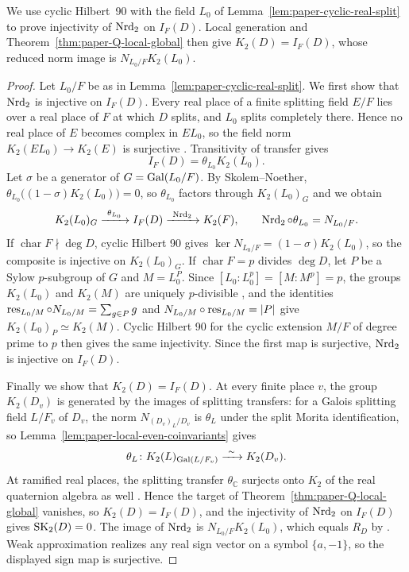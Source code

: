 We use cyclic Hilbert~90 with the field $L_0$ of Lemma~\ref{lem:paper-cyclic-real-split} to prove injectivity of $\operatorname{Nrd}_2$ on $I_F(D)$.
Local generation and Theorem~\ref{thm:paper-Q-local-global} then give $K_2(D)=I_F(D)$, whose reduced norm image is $N_{L_0/F}K_2(L_0)$.

\begin{proof}
Let $L_0/F$ be as in Lemma~\ref{lem:paper-cyclic-real-split}.
We first show that $\operatorname{Nrd}_2$ is injective on $I_F(D)$.
Every real place of a finite splitting field $E/F$ lies over a real place of $F$ at which $D$ splits, and $L_0$ splits completely there.
Hence no real place of $E$ becomes complex in $EL_0$, so the field norm $K_2(EL_0)\to K_2(E)$ is surjective \cite[\S2, Theorem 2]{BakRehmann1984}.
Transitivity of transfer gives
\[
 I_F(D)=\theta_{L_0}K_2(L_0).
\]
Let $\sigma$ be a generator of $G=\operatorname{Gal}(L_0/F)$.
By Skolem--Noether, $\theta_{L_0}\bigl((1-\sigma)K_2(L_0)\bigr)=0$, so $\theta_{L_0}$ factors through $K_2(L_0)_G$ and we obtain
\[
 K_2(L_0)_G\xrightarrow{\ \theta_{L_0}\ }I_F(D)\xrightarrow{\ \Nrd_2\ }K_2(F),
 \qquad \Nrd_2\circ\theta_{L_0}=N_{L_0/F}.
\]
If $\operatorname{char}F\nmid\deg D$, cyclic Hilbert 90 \cite[Theorem 14.1]{MerkurjevSuslin1982} gives $\ker N_{L_0/F}=(1-\sigma)K_2(L_0)$, so the composite is injective on $K_2(L_0)_G$.
If $\operatorname{char}F=p$ divides $\deg D$, let $P$ be a Sylow $p$-subgroup of $G$ and $M=L_0^P$.
Since $[L_0:L_0^p]=[M:M^p]=p$, the groups $K_2(L_0)$ and $K_2(M)$ are uniquely $p$-divisible \cite[Theorem 8.1]{GeisserLevine}, and the identities $\operatorname{res}_{L_0/M}\circ N_{L_0/M}=\sum_{g\in P}g$ and $N_{L_0/M}\circ\operatorname{res}_{L_0/M}=|P|$ give $K_2(L_0)_P\simeq K_2(M)$.
Cyclic Hilbert 90 for the cyclic extension $M/F$ of degree prime to $p$ then gives the same injectivity.
Since the first map is surjective, $\operatorname{Nrd}_2$ is injective on $I_F(D)$.

Finally we show that $K_2(D)=I_F(D)$.
At every finite place $v$, the group $K_2(D_v)$ is generated by the images of splitting transfers: for a Galois splitting field $L/F_v$ of $D_v$, the norm $N_{(D_v)_L/D_v}$ is $\theta_L$ under the split Morita identification, so Lemma~\ref{lem:paper-local-even-coinvariants} gives
\[
 \theta_L\colon K_2(L)_{\operatorname{Gal}(L/F_v)}\xrightarrow{\ \sim\ }K_2(D_v).
\]
At ramified real places, the splitting transfer $\theta_{\mathbb C}$ surjects onto $K_2$ of the real quaternion algebra as well \cite[Proposition 6.6.1(2)]{KahnLevine2010}.
Hence the target of Theorem~\ref{thm:paper-Q-local-global} vanishes, so $K_2(D)=I_F(D)$, and the injectivity of $\operatorname{Nrd}_2$ on $I_F(D)$ gives $\operatorname{SK}_2(D)=0$.
The image of $\operatorname{Nrd}_2$ is $N_{L_0/F}K_2(L_0)$, which equals $R_D$ by \cite[\S2, Theorem 2]{BakRehmann1984}.
Weak approximation realizes any real sign vector on a symbol $\{a,-1\}$, so the displayed sign map is surjective.
\end{proof}

